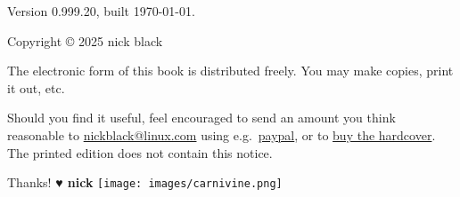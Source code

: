 \clearpage
\noindent{}Version 0.999.20, built \today.

\bigskip
Copyright © 2025 nick black

\bigskip
The electronic form of this book is distributed freely.
You may make copies, print it out, etc.

Should you find it useful, feel encouraged to send an amount you think reasonable to
  \href{mailto:nickblack@linux.com}{nickblack@linux.com} using
  e.g.\ \href{https://paypal.me/dankamongmen}{paypal},
  or to \href{https://goldandappelpub.com/pgo-quantitative.html}{buy the hardcover}.
The printed edition does not contain this notice.

Thanks! {\textbf{♥ nick}}
\vfill\texttt{[image: images/carnivine.png]}\vfill
